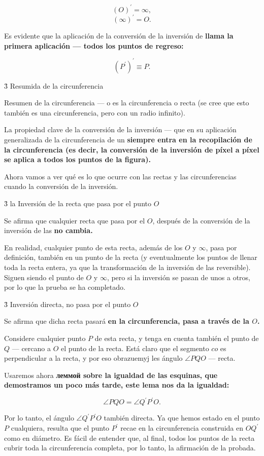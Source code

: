 $$ (O)^\prime = \infty, $$
$$ (\infty)^\prime = O. $$

Es evidente que la aplicación de la conversión de la inversión de \bf{llama} la primera aplicación --- todos los puntos de regreso:

$$ \left( P^\prime \right) ^\prime \equiv P. $$


\h3{ Resumida de la circunferencia }

Resumen de la circunferencia --- o es la circunferencia o recta (se cree que esto también es una circunferencia, pero con un radio infinito).

La propiedad clave de la conversión de la inversión --- que en su aplicación generalizada de la circunferencia de un \bf{siempre entra en la recopilación de la circunferencia} (es decir, la conversión de la inversión de píxel a píxel se aplica a todos los puntos de la figura).

Ahora vamos a ver qué es lo que ocurre con las rectas y las circunferencias cuando la conversión de la inversión.


\h3{ la Inversión de la recta que pasa por el punto $O$ }

Se afirma que cualquier recta que pasa por el $O$, después de la conversión de la inversión de las \bf{no cambia}.

En realidad, cualquier punto de esta recta, además de los $O$ y $\infty$, pasa por definición, también en un punto de la recta (y eventualmente los puntos de llenar toda la recta entera, ya que la transformación de la inversión de las reversible). Siguen siendo el punto de $O$ y $\infty$, pero si la inversión se pasan de unos a otros, por lo que la prueba se ha completado.


\h3{ Inversión directa, no pasa por el punto $O$ }

Se afirma que dicha recta pasará \bf{en la circunferencia}, pasa a través de la $O$.


Considere cualquier punto $P$ de esta recta, y tenga en cuenta también el punto de $Q$ --- cercano a $O$ el punto de la recta. Está claro que el segmento $co$ es perpendicular a la recta, y por eso obrazuemyj les ángulo $\angle PQO$ --- recta.

Usaremos ahora \bf{леммой sobre la igualdad de las esquinas}, que demostramos un poco más tarde, este lema nos da la igualdad:

$$ \angle PQO = \angle Q^\prime P^\prime O. $$

Por lo tanto, el ángulo $\angle Q^\prime P^\prime O$ también directa. Ya que hemos estado en el punto $P$ cualquiera, resulta que el punto $P^\prime$ recae en la circunferencia construida en $O Q^\prime$ como en diámetro. Es fácil de entender que, al final, todos los puntos de la recta cubrir toda la circunferencia completa, por lo tanto, la afirmación de la probada.


